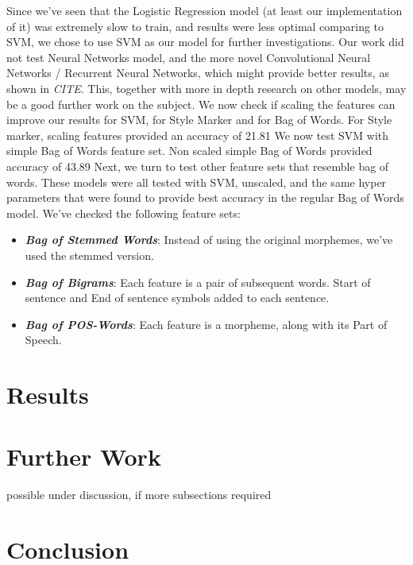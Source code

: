 \documentclass[a4paper]{article}
\begin{document}
Since we've seen that the Logistic Regression model (at least our implementation of it) was extremely slow to train, and results were less optimal comparing to SVM, we chose to use SVM as our model for further investigations.
Our work did not test Neural Networks model, and the more novel Convolutional Neural Networks / Recurrent Neural Networks, which might provide better results, as shown in \emph{CITE}. This, together with more in depth research on other models, may be a good further work on the subject.
We now check if scaling the features can improve our results for SVM, for Style Marker and for Bag of Words.
For Style marker, scaling features provided an accuracy of 21.81%
We now test SVM with simple Bag of Words feature set.
Non scaled simple Bag of Words provided accuracy of 43.89%
Next, we turn to test other feature sets that resemble bag of words. These models were all tested with SVM, unscaled, and the same hyper parameters that were found to provide best accuracy in the regular Bag of Words model. We've checked the following feature sets:
\begin{itemize}
\item \textbf{\emph{Bag of Stemmed Words}}: Instead of using the original morphemes, we've used the stemmed version.
\item \textbf{\emph{Bag of Bigrams}}: Each feature is a pair of subsequent words. Start of sentence and End of sentence symbols added to each sentence.
\item \textbf{\emph{Bag of POS-Words}}: Each feature is a morpheme, along with its Part of Speech.
\end{itemize}
\section{Results}
\label{Results}
\section{Further Work}
\label{Further Work}
possible under discussion, if more subsections required
\section{Conclusion}
\label{Conclusion}
\end{document}
